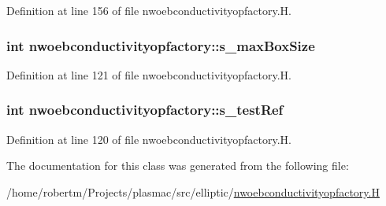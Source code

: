 Definition at line 156 of file nwoebconductivityopfactory.\+H.

\subsubsection[{\texorpdfstring{s\+\_\+max\+Box\+Size}{s_maxBoxSize}}]{\setlength{\rightskip}{0pt plus 5cm}int nwoebconductivityopfactory\+::s\+\_\+max\+Box\+Size\hspace{0.3cm}{\ttfamily [static]}}\hypertarget{classnwoebconductivityopfactory_a4bd3b73eb5242930d37b33281cee9bc7}{}\label{classnwoebconductivityopfactory_a4bd3b73eb5242930d37b33281cee9bc7}


Definition at line 121 of file nwoebconductivityopfactory.\+H.

\subsubsection[{\texorpdfstring{s\+\_\+test\+Ref}{s_testRef}}]{\setlength{\rightskip}{0pt plus 5cm}int nwoebconductivityopfactory\+::s\+\_\+test\+Ref\hspace{0.3cm}{\ttfamily [static]}}\hypertarget{classnwoebconductivityopfactory_a36409fd2d7379a11d128ee561206787f}{}\label{classnwoebconductivityopfactory_a36409fd2d7379a11d128ee561206787f}


Definition at line 120 of file nwoebconductivityopfactory.\+H.



The documentation for this class was generated from the following file\+:\begin{DoxyCompactItemize}
\item 
/home/robertm/\+Projects/plasmac/src/elliptic/\hyperlink{nwoebconductivityopfactory_8H}{nwoebconductivityopfactory.\+H}\end{DoxyCompactItemize}
